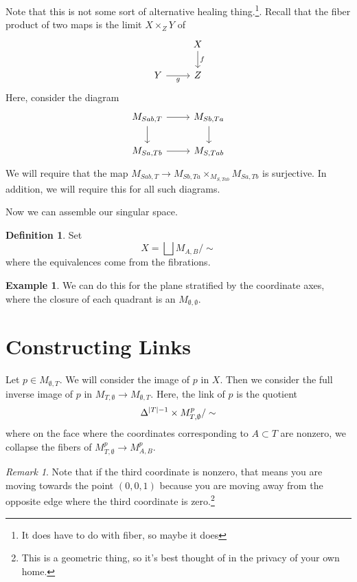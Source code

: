 \documentclass[leqno, openany]{memoir}
\theoremstyle{definition}
\newtheorem{defn}[thm]{Definition}
\newtheorem{exm}[thm]{Example}
\theoremstyle{remark}
\newtheorem{rmk}[thm]{Remark}
\theoremstyle{plain}
\theoremstyle{definition}
\theoremstyle{remark}
\begin{document}
Note that this is not some sort of alternative healing thing.\footnote{It does
have to do with fiber, so maybe it does}. Recall that the fiber product of two
maps is the limit $X \times_Z Y$ of \begin{equation*} \begin{tikzcd} & X
    \arrow{d}{f} \\ Y \arrow[swap]{r}{g} & Z \end{tikzcd} \end{equation*} Here,
    consider the diagram \begin{equation*} \begin{tikzcd} M_{Sab,T} \arrow{r}
    \arrow{d} & M_{Sb,Ta} \arrow{d} \\ M_{Sa,Tb} \arrow{r} & M_{S, Tab}
\end{tikzcd} \end{equation*} We will require that the map $M_{Sab,T} \to
M_{Sb,Ta} \times_{M_{S, Tab}} M_{Sa,Tb}$ is surjective. In addition, we will
require this for all such diagrams.

Now we can assemble our singular space.  \begin{defn} Set \[ X = \bigsqcup
M_{A,B} / \sim \] where the equivalences come from the fibrations.  \end{defn}

\begin{exm} We can do this for the plane stratified by the coordinate axes,
where the closure of each quadrant is an $M_{\emptyset, \emptyset}$.  \end{exm}

\section{Constructing Links}%

Let $p \in M_{\emptyset, T}$. We will consider the image of $p$ in $X$. Then we
consider the full inverse image of $p$ in $M_{T,\emptyset} \to M_{\emptyset,
T}$. Here, the link of $p$ is the quotient \[ \Delta^{\abs{T} - 1} \times
M_{T,\emptyset}^p / \sim \] where on the face where the coordinates
corresponding to $A \subset T$ are nonzero, we collapse the fibers of
$M_{T,\emptyset}^p \to M_{A,B}^p$.

\begin{rmk} Note that if the third coordinate is nonzero, that means you are
    moving towards the point $(0,0,1)$ because you are moving away from the
    opposite edge where the third coordinate is zero.\footnote{This is a
    geometric thing, so it's best thought of in the privacy of your own home.}
\end{rmk}
\end{document}
